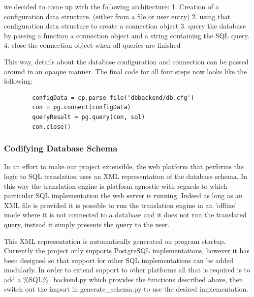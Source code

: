 \documentclass[a4paper, 11pt]{article}
\begin{document}
      we decided to come up with the following architecture: 
      1. Creation of a configuration data structure. (either from a file or user
         entry)
      2. using that configuration data structure to create a connection object
      3. query the database by passing a function a connection object and a
      string containing the SQL query.
      4. close the connection object when all queries are finished

      This way, details about the database configuration and connection 
      can be passed around in an opaque manner. The final code for all four
      steps now looks like the following: 

      \begin{verbatim}
        configData = cp.parse_file('dbbackend/db.cfg')
        con = pg.connect(configData)
        queryResult = pg.query(con, sql)
        con.close()
      \end{verbatim}

    \subsubsection{Codifying Database Schema}
      In an effort to make our project extensible, the web platform that performs 
      the logic to SQL translation uses an XML representation of the database
      schema. In this way the translation engine is platform agnostic with
      regards to which particular SQL implementation the web server is running.
      Indeed as long as an XML file is provided it is possible to run the
      translation engine in an 'offline' mode where it is not connected to a
      database and it does not run the translated query, instead it simply
      presents the query to the user.

      This XML representation is automatically generated on program startup.
      Currently the project only supports PostgreSQL implementations, however it
      has been designed so that support for other SQL implementations can be
      added modularly. In order to extend support to other platforms all that is
      required is to add a \%SQL\%\_backend.py which provides the functions
      described above, then switch out the import in generate\_schema.py to use
      the desired implementation.

\end{document}
